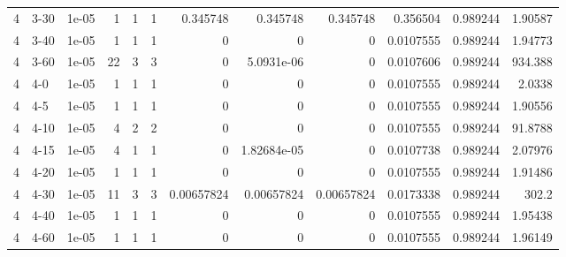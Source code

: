 \begin{tabular}{rlrrrrrrrrrr}
     4 & 3-30   &      1e-05 &           1 &                 1 &                 1 &     0.345748    &     0.345748    &      0.345748    &        0.356504  &               0.989244 &           1.90587  \\
     4 & 3-40   &      1e-05 &           1 &                 1 &                 1 &     0           &     0           &      0           &        0.0107555 &               0.989244 &           1.94773  \\
     4 & 3-60   &      1e-05 &          22 &                 3 &                 3 &     0           &     5.0931e-06  &      0           &        0.0107606 &               0.989244 &         934.388    \\
     4 & 4-0    &      1e-05 &           1 &                 1 &                 1 &     0           &     0           &      0           &        0.0107555 &               0.989244 &           2.0338   \\
     4 & 4-5    &      1e-05 &           1 &                 1 &                 1 &     0           &     0           &      0           &        0.0107555 &               0.989244 &           1.90556  \\
     4 & 4-10   &      1e-05 &           4 &                 2 &                 2 &     0           &     0           &      0           &        0.0107555 &               0.989244 &          91.8788   \\
     4 & 4-15   &      1e-05 &           4 &                 1 &                 1 &     0           &     1.82684e-05 &      0           &        0.0107738 &               0.989244 &           2.07976  \\
     4 & 4-20   &      1e-05 &           1 &                 1 &                 1 &     0           &     0           &      0           &        0.0107555 &               0.989244 &           1.91486  \\
     4 & 4-30   &      1e-05 &          11 &                 3 &                 3 &     0.00657824  &     0.00657824  &      0.00657824  &        0.0173338 &               0.989244 &         302.2      \\
     4 & 4-40   &      1e-05 &           1 &                 1 &                 1 &     0           &     0           &      0           &        0.0107555 &               0.989244 &           1.95438  \\
     4 & 4-60   &      1e-05 &           1 &                 1 &                 1 &     0           &     0           &      0           &        0.0107555 &               0.989244 &           1.96149  \\
\hline
\end{tabular}
